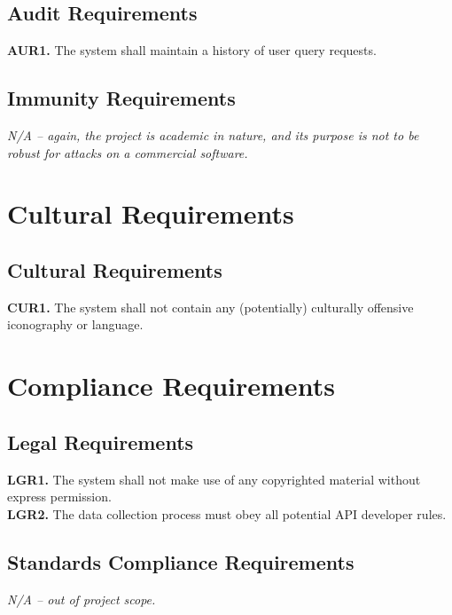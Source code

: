 \documentclass[12pt]{article}
\begin{document}
\subsection{Audit Requirements}
\textbf{AUR1.} The system shall maintain a history of user query requests.
\subsection{Immunity Requirements}
\emph{N/A -- again, the project is academic in nature, and its purpose is not to be robust for attacks on a commercial software.}
\section{Cultural Requirements}
\subsection{Cultural Requirements}
\textbf{CUR1.} The system shall not contain any (potentially) culturally offensive iconography or language.
\section{Compliance Requirements}
\subsection{Legal Requirements}
\textbf{LGR1.} The system shall not make use of any copyrighted material without express permission. \\
\textbf{LGR2.} The data collection process must obey all potential API developer rules.
\subsection{Standards Compliance Requirements}
\emph{N/A -- out of project scope.}
\end{document}
